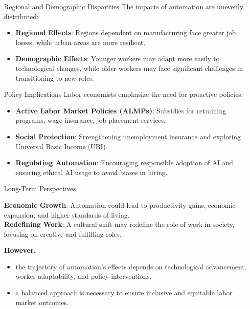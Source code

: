 \documentclass{beamer}
\begin{document}
\begin{frame}{Regional and Demographic Disparities}
The impacts of automation are unevenly distributed:
\vspace{0.5cm}
\begin{itemize}
    \item \textbf{Regional Effects}: Regions dependent on manufacturing face greater job losses, while urban areas are more resilient.
    \vspace{0.5cm}
    \item \textbf{Demographic Effects}: Younger workers may adapt more easily to technological changes, while older workers may face significant challenges in transitioning to new roles.
\end{itemize}
\end{frame}

\begin{frame}{Policy Implications}
Labor economists emphasize the need for proactive policies:
\vspace{0.5cm}
\begin{itemize}
    \item \textbf{Active Labor Market Policies (ALMPs)}: Subsidies for retraining programs, wage insurance, job placement services.
    \vspace{0.5cm}
    \item \textbf{Social Protection}: Strengthening unemployment insurance and exploring Universal Basic Income (UBI).
\vspace{0.5cm}
    \item \textbf{Regulating Automation}: Encouraging responsible adoption of AI and ensuring ethical AI usage to avoid biases in hiring.
\end{itemize}
\end{frame}

\begin{frame}{Long-Term Perspectives}

 \textbf{Economic Growth}: Automation could lead to productivity gains, economic expansion, and higher standards of living.
    \vspace{0.5cm}\\
  \textbf{Redefining Work}: A cultural shift may redefine the role of work in society, focusing on creative and fulfilling roles.

  \vspace{0.5cm}
\textbf{However, }
\begin{itemize}
\item the trajectory of automation’s effects depends on technological advancement, worker adaptability, and policy interventions. 
\item a balanced approach is necessary to ensure inclusive and equitable labor market outcomes.
\end{itemize}
\end{frame}
\end{document}
